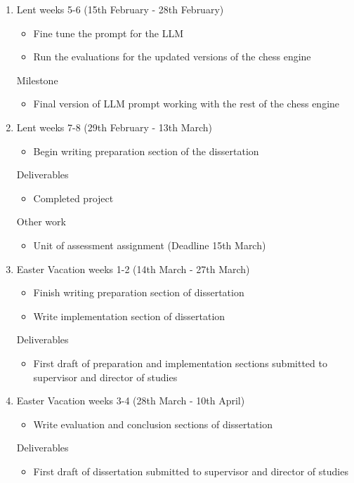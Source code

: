 \documentclass[12pt,a4paper]{article}
\begin{document}
\begin{enumerate}
    \item Lent weeks 5-6 (15th February - 28th February)
    \begin{itemize}
        \item Fine tune the prompt for the LLM
        \item Run the evaluations for the updated versions of the chess engine
    \end{itemize}
    Milestone
    \begin{itemize}
        \item Final version of LLM prompt working with the rest of the chess engine
    \end{itemize}

    \item Lent weeks 7-8 (29th February - 13th March)
    \begin{itemize}
        \item Begin writing preparation section of the dissertation
    \end{itemize}
    Deliverables
    \begin{itemize}
        \item Completed project
    \end{itemize}
    Other work
    \begin{itemize}
        \item Unit of assessment assignment (Deadline 15th March)
    \end{itemize}

    \item Easter Vacation weeks 1-2 (14th March - 27th March)
    \begin{itemize}
        \item Finish writing preparation section of dissertation
        \item Write implementation section of dissertation
    \end{itemize}
    Deliverables
    \begin{itemize}
        \item First draft of preparation and implementation sections submitted to supervisor and director of studies
    \end{itemize}

    \item Easter Vacation weeks 3-4 (28th March - 10th April)
    \begin{itemize}
        \item Write evaluation and conclusion sections of dissertation
    \end{itemize}
    Deliverables
    \begin{itemize}
        \item First draft of dissertation submitted to supervisor and director of studies
    \end{itemize}


\end{enumerate}
\end{document}
